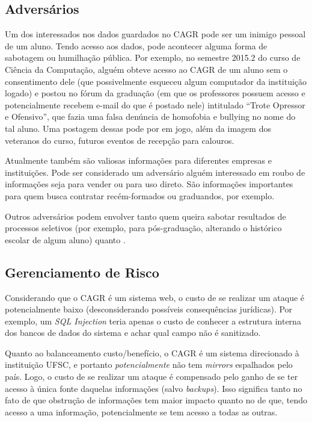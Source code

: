 \documentclass{article}
\newcommand{\todo}[1]{{\color{red}{#1}}}
\begin{document}
    \subsection{Adversários}

    Um dos interessados nos dados guardados no CAGR pode ser um inimigo pessoal
    de um aluno. Tendo acesso aos dados, pode acontecer alguma forma de
    sabotagem ou humilhação pública. Por exemplo, no semestre 2015.2 do curso
    de Ciência da Computação, alguém obteve acesso ao CAGR de um aluno sem o
    consentimento dele (que possivelmente esqueceu algum computador da
    instituição logado) e postou no fórum da graduação (em que os professores
    possuem acesso e potencialmente recebem e-mail do que é postado nele)
    intitulado ``Trote Opressor e Ofensivo'', que fazia uma falsa denúncia de
    homofobia e bullying no nome do tal aluno. Uma postagem dessas pode por em
    jogo, além da imagem dos veteranos do curso, futuros eventos de recepção
    para calouros.

    Atualmente também são valiosas informações para diferentes empresas e
    instituições. Pode ser considerado um adversário alguém interessado em
    roubo de informações seja para vender ou para uso direto. São informações
    importantes para quem busca contratar recém-formados ou graduandos, por
    exemplo.

    Outros adversários podem envolver tanto quem queira sabotar resultados de
    processos seletivos (por exemplo, para pós-graduação, alterando o histórico
    escolar de algum aluno) quanto \todo{quem mesmo?}.

    \subsection{Gerenciamento de Risco}

    Considerando que o CAGR é um sistema web, o custo de se realizar um ataque
    é potencialmente baixo (desconsiderando possíveis consequências jurídicas).
    Por exemplo, um \textit{SQL Injection} teria apenas o custo de conhecer a
    estrutura interna dos bancos de dados do sistema e achar qual campo não é
    sanitizado.

    Quanto ao balanceamento custo/benefício, o CAGR é um sistema direcionado à
    instituição UFSC, e portanto \emph{potencialmente} não tem \textit{mirrors}
    espalhados pelo país. Logo, o custo de se realizar um ataque é compensado
    pelo ganho de se ter acesso à única fonte daquelas informações (salvo
    \textit{backups}). Isso significa tanto no fato de que obstrução de
    informações tem maior impacto quanto no de que, tendo acesso a uma
    informação, potencialmente se tem acesso a todas as outras.
\end{document}
